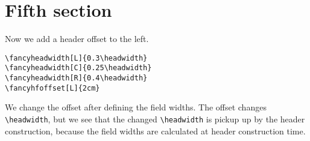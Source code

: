 \documentclass[oneside]{report}
\begin{document}
\fancyheadwidth[L]{0.3\headwidth}
\fancyheadwidth[C]{0.25\headwidth}
\fancyheadwidth[R]{0.4\headwidth}
\newpage

\section{Fifth section}

\noindent\begin{boxedminipage}{\textwidth}
  Now we add a header offset to the left.

\begin{verbatim}
\fancyheadwidth[L]{0.3\headwidth}
\fancyheadwidth[C]{0.25\headwidth}
\fancyheadwidth[R]{0.4\headwidth}
\fancyhfoffset[L]{2cm}
\end{verbatim}
  We change the offset after defining the field widths. The offset
  changes \verb|\headwidth|, but we see that the changed
  \verb|\headwidth| is pickup up by the header construction, because the
  field widths are calculated at header construction time.
\end{boxedminipage}

\fancyheadwidth[L]{0.3\headwidth}
\fancyheadwidth[C]{0.25\headwidth}
\fancyheadwidth[R]{0.4\headwidth}
\fancyhfoffset[L]{2cm}
\end{document}

